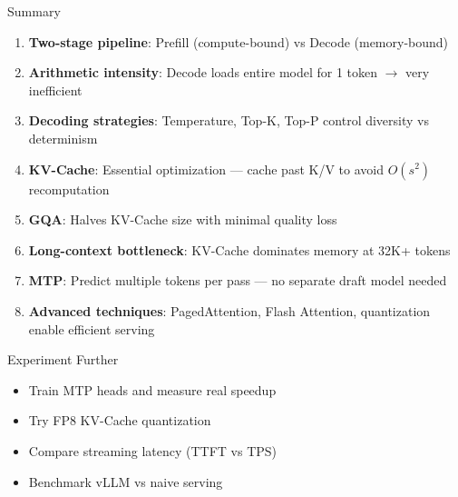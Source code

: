 \documentclass[aspectratio=169, 11pt]{beamer}
\begin{document}
\begin{frame}{Summary}

	\begin{enumerate}
		\item \textbf{Two-stage pipeline}: Prefill (compute-bound) vs Decode (memory-bound)
		\item \textbf{Arithmetic intensity}: Decode loads entire model for 1 token $\rightarrow$ very inefficient
		\item \textbf{Decoding strategies}: Temperature, Top-K, Top-P control diversity vs determinism
		\item \textbf{KV-Cache}: Essential optimization --- cache past K/V to avoid $O(s^2)$ recomputation
		\item \textbf{GQA}: Halves KV-Cache size with minimal quality loss
		\item \textbf{Long-context bottleneck}: KV-Cache dominates memory at 32K+ tokens
		\item \textbf{MTP}: Predict multiple tokens per pass --- no separate draft model needed
		\item \textbf{Advanced techniques}: PagedAttention, Flash Attention, quantization enable efficient serving
	\end{enumerate}

	\begin{block}{Experiment Further}
		\begin{itemize}
			\item Train MTP heads and measure real speedup
			\item Try FP8 KV-Cache quantization
			\item Compare streaming latency (TTFT vs TPS)
			\item Benchmark vLLM vs naive serving
		\end{itemize}
	\end{block}

\end{frame}
\end{document}

